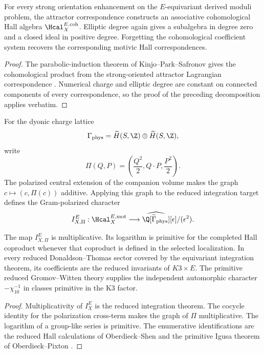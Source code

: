 \begin{theorem}
For every strong orientation enhancement on the $E$-equivariant derived moduli problem, the attractor correspondence constructs an associative cohomological Hall algebra $\Hcal_X^{E,\mathrm{coh}}$.  Elliptic degree again gives a subalgebra in degree zero and a closed ideal in positive degree.  Forgetting the cohomological coefficient system recovers the corresponding motivic Hall correspondences.
\end{theorem}
\begin{proof}
The parabolic-induction theorem of Kinjo--Park--Safronov gives the cohomological product from the strong-oriented attractor Lagrangian correspondence \cite{KPS}.  Numerical charge and elliptic degree are constant on connected components of every correspondence, so the proof of the preceding decomposition applies verbatim.
\end{proof}

For the dyonic charge lattice
\[
 \Gamma_{\mathrm{phys}}
 =\widetilde H(S,\Z)\oplus\widetilde H(S,\Z),
\]
write
\[
 \Pi(Q,P)=\left(\frac{Q^2}{2},Q\cdot P,\frac{P^2}{2}\right).
\]
The polarized central extension of the companion volume makes the graph $c\mapsto(c,\Pi(c))$ additive.  Applying this graph to the reduced integration target defines the Gram-polarized character
\[
 I_{X,\Pi}^E:
 \Hcal_X^{E,\mathrm{mot}}
 \longrightarrow
 \widehat{\Q[\widetilde\Gamma_{\mathrm{phys}}]}[\epsilon]/(\epsilon^2).
\]

\begin{theorem}
The map $I_{X,\Pi}^E$ is multiplicative.  Its logarithm is primitive for the completed Hall coproduct whenever that coproduct is defined in the selected localization.  In every reduced Donaldson--Thomas sector covered by the equivariant integration theorem, its coefficients are the reduced invariants of $K3\times E$.  The primitive reduced Gromov--Witten theory supplies the independent automorphic character $-\chi_{10}^{-1}$ in classes primitive in the K3 factor.
\end{theorem}
\begin{proof}
Multiplicativity of $I_X^E$ is the reduced integration theorem.  The cocycle identity for the polarization cross-term makes the graph of $\Pi$ multiplicative.  The logarithm of a group-like series is primitive.  The enumerative identifications are the reduced Hall calculations of Oberdieck--Shen and the primitive Igusa theorem of Oberdieck--Pixton \cite{OberdieckShen,OP}.
\end{proof}

